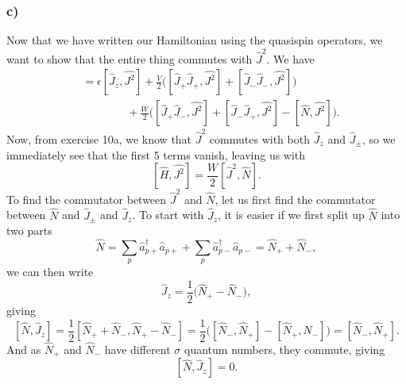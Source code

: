 \documentclass[a4paper, 11pt, notitlepage, english]{article}
\newcommand{\op}[1]{\hat{#1}}
\newcommand{\eps}{\epsilon}
\begin{document}
\clearpage

\subsubsection*{c)}
Now that we have written our Hamiltonian using the quasispin operators, we want to show that the entire thing commutes with $\op{J}^2$. We have
\begin{align*}
[\op{H}, \op{J^2}] &= \eps[\op{J}_z, \op{J^2}] + \frac{V}{2}\big([\op{J}_+\op{J}_+,\op{J^2}] + [\op{J}_-\op{J}_-,\op{J^2}]\big) \\
&\qquad\qquad+ \frac{W}{2}\big([\op{J}_+\op{J}_-,\op{J^2}] + [\op{J}_-\op{J}_+,\op{J^2}] - [\op{N},\op{J^2}]\big).
\end{align*}
Now, from exercise 10a, we know that $\op{J}^2$ commutes with both $\op{J}_z$ and $\op{J}_\pm$, so we immediately see that the first 5 terms vanish, leaving us with
$$[\op{H}, \op{J^2}] = \frac{W}{2}[\op{J}^2, \op{N}].$$
To find the commutator between $\op{J}^2$ and $\op{N}$, let us first find the commutator between $\op{N}$ and $\op{J}_\pm$ and $\op{J}_z$. To start with $\op{J}_z$, it is easier if we first split up $\op{N}$ into two parts
$$\op{N} = \sum_{p}\op{a}_{p+}^\dagger\op{a}_{p+} + \sum_{p}\op{a}_{p-}^\dagger\op{a}_{p-} = \op{N}_+ + \op{N}_-,$$
we can then write 
$$\op{J}_z = \frac{1}{2}\big(\op{N}_+ - \op{N}_-\big),$$
giving
$$[\op{N},\op{J}_z] = \frac{1}{2}[\op{N}_+ + \op{N}_-, \op{N}_+ - \op{N}_-] = \frac{1}{2}\big([\op{N}_-, \op{N}_+] - [\op{N}_+, {N}_-]\big) = [\op{N}_-,\op{N}_+].$$
And as $\op{N}_+$ and $\op{N}_-$ have different $\sigma$ quantum numbers, they commute, giving
$$[\op{N},\op{J}_z] = 0.$$
\end{document}
